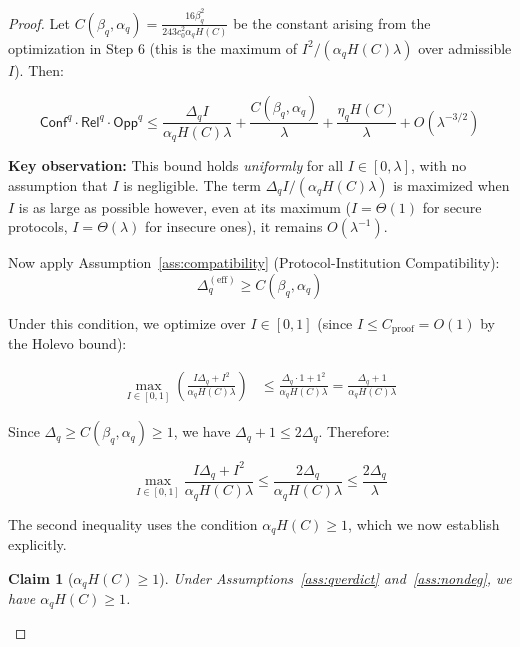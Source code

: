 \documentclass{ieeeaccess}
\newcommand{\Conf}{\mathsf{Conf}}
\newcommand{\Rel}{\mathsf{Rel}}
\newcommand{\Opp}{\mathsf{Opp}}
\newtheorem{claim}{Claim}[section]
\begin{document}
\begin{proof}
Let $C(\beta_q,\alpha_q) = \frac{16\beta_q^2}{243 c_0^2 \alpha_q H(C)}$ be the constant arising from the optimization in Step 6 (this is the maximum of $I^2/(\alpha_q H(C) \lambda)$ over admissible $I$). Then:

\begin{equation}
\label{eq:final_uniform}
    \Conf^q \cdot \Rel^q \cdot \Opp^q \leq \frac{\Delta_q I}{\alpha_q H(C) \lambda} + \frac{C(\beta_q,\alpha_q)}{\lambda} + \frac{\eta_q H(C)}{\lambda} + O(\lambda^{-3/2})
\end{equation}

\textbf{Key observation:} This bound holds \emph{uniformly} for all $I \in [0, \lambda]$, with no assumption that $I$ is negligible. The term $\Delta_q I/(\alpha_q H(C) \lambda)$ is maximized when $I$ is as large as possible however, even at its maximum ($I = \Theta(1)$ for secure protocols, $I = \Theta(\lambda)$ for insecure ones), it remains $O(\lambda^{-1})$.

Now apply Assumption~\ref{ass:compatibility} (Protocol-Institution Compatibility):
\begin{equation}
    \Delta_q^{\mathrm{(eff)}} \geq C(\beta_q,\alpha_q)
\end{equation}

Under this condition, we optimize over $I \in [0,1]$ (since $I \leq C_{\mathrm{proof}} = O(1)$ by the Holevo bound):

\begin{align}
    \max_{I \in [0,1]} \left(\frac{I\Delta_q + I^2}{\alpha_q H(C)\lambda}\right)
    &\leq \frac{\Delta_q \cdot 1 + 1^2}{\alpha_q H(C)\lambda}
     = \frac{\Delta_q + 1}{\alpha_q H(C)\lambda}
\end{align}

Since $\Delta_q \geq C(\beta_q,\alpha_q) \geq 1$, we have $\Delta_q + 1 \leq 2\Delta_q$. Therefore:

\begin{equation}
    \max_{I \in [0,1]} \frac{I\Delta_q + I^2}{\alpha_q H(C)\lambda}
    \leq \frac{2\Delta_q}{\alpha_q H(C)\lambda} 
    \leq \frac{2\Delta_q}{\lambda}
\end{equation}

The second inequality uses the condition $\alpha_q H(C) \geq 1$, 
which we now establish explicitly.

\begin{claim}[$\alpha_q H(C) \geq 1$]
\label{claim:alphahc}
Under Assumptions~\ref{ass:qverdict} and~\ref{ass:nondeg}, 
we have $\alpha_q H(C) \geq 1$.


\end{claim}
\end{proof}
\end{document}
